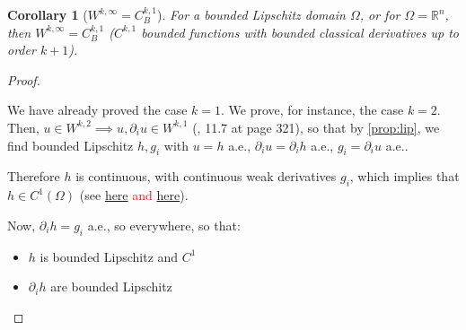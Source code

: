 \documentclass[english,a4paper,10pt,oneside]{scrbook}	%
\theoremstyle{break}
\newtheorem{cor}[equation]{Corollary}
\newenvironment{mproof}[1][\proofname]{%
  \begin{proof}[#1]$ $\par\nobreak\ignorespaces
}{%
  \end{proof}
}
\renewcommand*{\proofname}{Proof}
\theoremstyle{remark}
\newcommand{\mR}{\mathbb{R}}
\begin{document}
\begin{cor}[$W^{k,\infty}=C^{k,1}_B$]
\label{prop:lipk}
For a bounded Lipschitz domain $\Omega$, or for $\Omega = \mR^n$, then $W^{k,\infty}=C^{k,1}_B$ ($C^{k,1}$ bounded functions with bounded classical derivatives up to order $k+1$).
\end{cor}
\begin{mproof}

We have already proved the case $k=1$. We prove, for instance, the case $k=2$. Then, $u \in W^{k,2} \implies u, \partial_i u \in W^{k,1}$ (\cite{leoni}, 11.7 at page 321), so that by \cref{prop:lip}, we find bounded Lipschitz $h, g_i$ with $u=h$ a.e., $\partial_i u = \partial_i h$ a.e., $g_i = \partial_i u$ a.e..

Therefore $h$ is continuous, with continuous weak derivatives $g_i$, which implies that $h \in C^1(\Omega)$ (see \textcolor{red}{\href{https://math.stackexchange.com/questions/497708/is-a-continuous-function-with-continuous-weak-derivatives-of-class-c1}{here} and \href{https://math.stackexchange.com/questions/1787716/u-continuous-and-the-weak-derivative-du-continuous-rightarrow-u-in-c1}{here}}).

Now, $\partial_i h =g_i$ a.e., so everywhere, so that:

\begin{itemize}
\item $h$ is bounded Lipschitz and $C^1$
\item $\partial_i h$ are bounded Lipschitz
\end{itemize}


\end{mproof}
\end{document}
